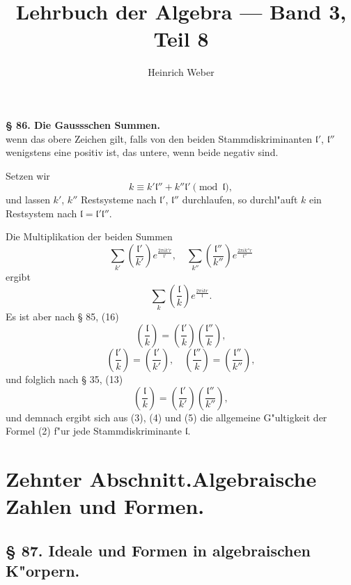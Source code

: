\documentclass[12pt,a4paper]{article}
\title{Lehrbuch der Algebra --- Band 3, Teil 8}
\author{Heinrich Weber}
\date{}
\theoremstyle{plain}
\begin{document}
\maketitle
\thispagestyle{fancy}

\noindent\textbf{\S{} 86. Die Gaussschen Summen.}\\[4pt]
wenn das obere Zeichen gilt, falls von den beiden Stammdiskrimi\-nanten $\mathfrak{l}'$, $\mathfrak{l}''$ wenigstens eine positiv ist, das untere, wenn beide negativ sind.

Setzen wir
\[
k \equiv k'\mathfrak{l}'' + k''\mathfrak{l}' \pmod{\mathfrak{l}},
\]
und lassen $k'$, $k''$ Restsysteme nach $\mathfrak{l}'$, $\mathfrak{l}''$ durchlaufen, so durchl"auft $k$ ein Restsystem nach $\mathfrak{l} = \mathfrak{l}'\mathfrak{l}''$.

Die Multiplikation der beiden Summen
\begin{equation}
\sum_{k'} \left(\frac{\mathfrak{l}'}{k'}\right) e^{\frac{2\pi i k' r}{\mathfrak{l}'}},
\quad
\sum_{k''} \left(\frac{\mathfrak{l}''}{k''}\right) e^{\frac{2\pi i k'' r}{\mathfrak{l}''}}
\tag{4}
\end{equation}
ergibt
\begin{equation}
\sum_{k} \left(\frac{\mathfrak{l}}{k}\right) e^{\frac{2\pi i k r}{\mathfrak{l}}}.
\tag{5}
\end{equation}
Es ist aber nach \S{} 85, (16)
\[
\left(\frac{\mathfrak{l}}{k}\right) = \left(\frac{\mathfrak{l}'}{k}\right)\left(\frac{\mathfrak{l}''}{k}\right),
\]
\[
\left(\frac{\mathfrak{l}'}{k}\right) = \left(\frac{\mathfrak{l}'}{k'}\right),\quad
\left(\frac{\mathfrak{l}''}{k}\right) = \left(\frac{\mathfrak{l}''}{k''}\right),
\]
und folglich nach \S{} 35, (13)
\[
\left(\frac{\mathfrak{l}}{k}\right) = \left(\frac{\mathfrak{l}'}{k'}\right)\left(\frac{\mathfrak{l}''}{k''}\right),
\]
und demnach ergibt sich aus (3), (4) und (5) die allgemeine G"ultigkeit der Formel (2) f"ur jede Stammdiskriminante $\mathfrak{l}$.

\newpage
\section*{Zehnter Abschnitt.\quad Algebraische Zahlen und Formen.}

\subsection*{\S{} 87. Ideale und Formen in algebraischen K"orpern.}
\end{document}
